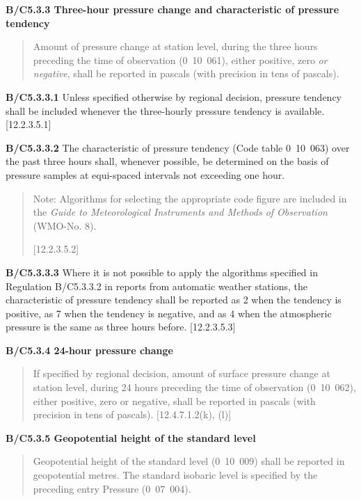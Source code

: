 \textbf{B/C5.3.3 Three-hour pressure change and characteristic of pressure tendency}

\begin{quote}
Amount of pressure change at station level, during the three hours preceding the time of observation (0~10~061), either positive, zero \emph{or negative}, shall be reported in pascals (with precision in tens of pascals).
\end{quote}

\textbf{B/C5.3.3.1} Unless specified otherwise by regional decision, pressure tendency shall be included whenever the three-hourly pressure tendency is available. {[}12.2.3.5.1{]}

\textbf{B/C5.3.3.2} The characteristic of pressure tendency (Code table 0~10~063) over the past three hours shall, whenever possible, be determined on the basis of pressure samples at equi-spaced intervals not exceeding one hour.

\begin{quote}
Note: Algorithms for selecting the appropriate code figure are included in the \emph{Guide to Meteorological Instruments and Methods of Observation} (WMO-No. 8).

{[}12.2.3.5.2{]}
\end{quote}

\textbf{B/C5.3.3.3} Where it is not possible to apply the algorithms specified in Regulation B/C5.3.3.2 in reports from automatic weather stations, the characteristic of pressure tendency shall be reported as 2 when the tendency is positive, as 7 when the tendency is negative, and as 4 when the atmospheric pressure is the same as three hours before. {[}12.2.3.5.3{]}

\textbf{B/C5.3.4 24-hour pressure change}

\begin{quote}
If specified by regional decision, amount of surface pressure change at station level, during 24 hours preceding the time of observation (0~10~062), either positive, zero or negative, shall be reported in pascals (with precision in tens of pascals). {[}12.4.7.1.2(k), (l){]}
\end{quote}

\textbf{B/C5.3.5 Geopotential height of the standard level}

\begin{quote}
Geopotential height of the standard level (0~10~009) shall be reported in geopotential metres. The standard isobaric level is specified by the preceding entry Pressure (0~07~004).
\end{quote}

